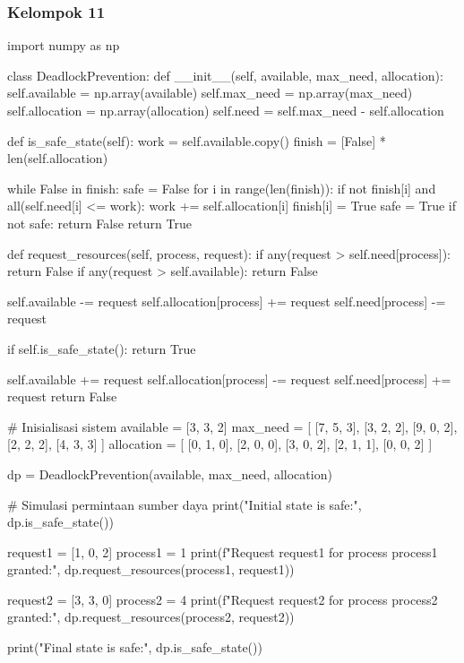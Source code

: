\documentclass[12pt]{article}
\begin{document}
\subsubsection{Kelompok 11}
\begin{python}
    import numpy as np

    class DeadlockPrevention:
    def __init__(self, available, max_need, allocation):
        self.available = np.array(available)
        self.max_need = np.array(max_need)
        self.allocation = np.array(allocation)
        self.need = self.max_need - self.allocation

    def is_safe_state(self):
        work = self.available.copy()
        finish = [False] * len(self.allocation)
        
        while False in finish:
            safe = False
            for i in range(len(finish)):
                if not finish[i] and all(self.need[i] <= work):
                    work += self.allocation[i]
                    finish[i] = True
                    safe = True
            if not safe:
                return False
        return True

    def request_resources(self, process, request):
        if any(request > self.need[process]):
            return False
        if any(request > self.available):
            return False
        
        self.available -= request
        self.allocation[process] += request
        self.need[process] -= request
        
        if self.is_safe_state():
            return True
        
        self.available += request
        self.allocation[process] -= request
        self.need[process] += request
        return False

    # Inisialisasi sistem
    available = [3, 3, 2]
    max_need = [
    [7, 5, 3],
    [3, 2, 2],
    [9, 0, 2],
    [2, 2, 2],
    [4, 3, 3]
    ]
    allocation = [
    [0, 1, 0],
    [2, 0, 0],
    [3, 0, 2],
    [2, 1, 1],
    [0, 0, 2]
    ]

    dp = DeadlockPrevention(available, max_need, allocation)

    # Simulasi permintaan sumber daya
    print("Initial state is safe:", dp.is_safe_state())

    request1 = [1, 0, 2]
    process1 = 1
    print(f"Request {request1} for process {process1} granted:", dp.request_resources(process1, request1))
    
    request2 = [3, 3, 0]
    process2 = 4
    print(f"Request {request2} for process {process2} granted:", dp.request_resources(process2, request2))
    
    print("Final state is safe:", dp.is_safe_state())
    
\end{python}
\end{document}
